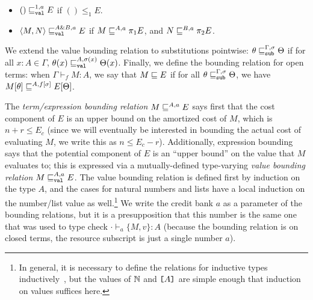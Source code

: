 \begin{definition}
\begin{itemize}
    \item $() \sqsubseteq_{\texttt{val}}^{1,a} E$ if $() \leq_1 E$.
    \item $\langle M,N \rangle \sqsubseteq_{\texttt{val}}^{A \& B,a} E$ if $M \sqsubseteq^{A,a} \pi_1 E$, and $N \sqsubseteq^{B,a} \pi_2 E$.
\end{itemize}
We extend the value bounding relation to substitutions pointwise: $\theta \sqsubseteq_{\texttt{sub}}^{\Gamma,\sigma} \Theta$ if for all $x : A \in \Gamma$, $\theta(x) \sqsubseteq_{\texttt{val}}^{A,\sigma(x)} \Theta(x)$. Finally, we define the bounding relation for open terms: when $\Gamma \vdash_f M : A$, we say that $M \sqsubseteq E$ if for all $\theta \sqsubseteq_{\texttt{sub}}^{\Gamma,\sigma} \Theta$, we have $M[\theta] \sqsubseteq^{A,f[\sigma]} E[\Theta]$.
\end{definition}

The \emph{term/expression bounding relation} $M \sqsubseteq^{A,a} E$ says
first that the cost component of $E$ is an upper bound on the amortized
cost of $M$, which is $n + r \leq E_c$ (since we will eventually be
interested in bounding the actual cost of evaluating $M$, we write this
as $n \leq E_c - r$).  Additionally, expression bounding says that the
potential component of $E$ is an ``upper bound'' on the value that $M$
evaluates to; this is expressed via a mutually-defined type-varying
\emph{value bounding relation} $M \sqsubseteq_{\texttt{val}}^{A,a} E$.  The value bounding
relation is defined first by induction on the type $A$, and the cases
for natural numbers and lists have a local induction on the number/list
value as well.\footnote{In general, it is necessary to define the
  relations for inductive types inductively~\cite{danner-et-al:icfp15},
  but the values of $\mathbb{N}$ and $\texttt{[}A\texttt{]}$ are simple enough that
  induction on values suffices here.}  We write the credit bank $a$ as a
parameter of the bounding relations, but it is a presupposition that
this number is the same one that was used to type check $\cdot \vdash_a
\{M,v\} : A$ (because the bounding relation is on closed terms, the resource
subscript is just a single number $a$).  



